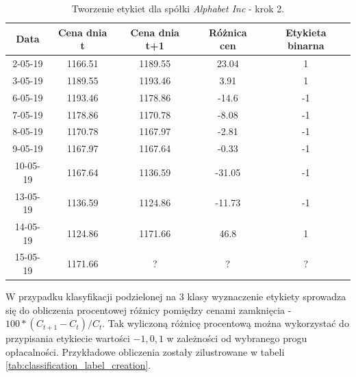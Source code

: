 \documentclass[a4paper, twoside, 11pt, openright]{article}
\begin{document}
 \begin{table}[H]
    \centering
    \begin{tabular}{|c|c|c|c|c|}
    \hline
        \textbf{Data}  & \textbf{Cena dnia t} & \textbf{Cena dnia t+1} & \textbf{Różnica cen} & \textbf{Etykieta binarna} \\ \hline
            2-05-19 & 1166.51 & 1189.55 & 23.04 & 1 \\ \hline
            3-05-19 & 1189.55 & 1193.46 & 3.91 & 1 \\ \hline
            6-05-19 & 1193.46 & 1178.86 & -14.6 & -1 \\ \hline
            7-05-19 & 1178.86 & 1170.78 & -8.08 & -1\\ \hline
            8-05-19 & 1170.78 & 1167.97 & -2.81 & -1\\ \hline
            9-05-19 & 1167.97 & 1167.64 & -0.33 & -1\\ \hline
            10-05-19 & 1167.64 & 1136.59 & -31.05 & -1\\ \hline
            13-05-19 & 1136.59 & 1124.86 & -11.73 & -1\\ \hline
            14-05-19 & 1124.86 & 1171.66 & 46.8 & 1\\ \hline 
            15-05-19 & 1171.66 & ?      & ? & ? \\ \hline
    \end{tabular}
    \caption{Tworzenie etykiet dla spółki \textit{Alphabet Inc} - krok 2.}
    \label{tab:binary_label_creation}
\end{table} 

 W przypadku klasyfikacji podzielonej na 3 klasy wyznaczenie etykiety sprowadza się do obliczenia procentowej różnicy pomiędzy cenami zamknięcia - $100*(C_{t+1}-C_t)/C_t$. Tak wyliczoną różnicę procentową można wykorzystać do przypisania etykiecie wartości $-1, 0, 1$ w zależności od wybranego progu opłacalności. Przykładowe obliczenia zostały zilustrowane w tabeli \ref{tab:classification_label_creation}.
\end{document}
